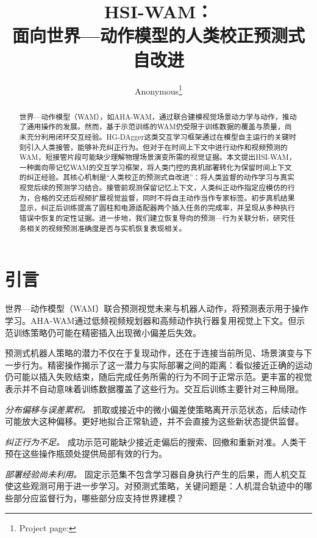 \documentclass[letterpaper,10pt,conference]{ieeeconf}
\title{HSI-WAM：\\面向世界—动作模型的人类校正预测式自改进}
\author{Anonymous\thanks{Project page: \projecturl}}
\begin{document}
\maketitle
\thispagestyle{empty}
\pagestyle{empty}

\begin{abstract}
世界—动作模型（WAM），如AHA-WAM，通过联合建模视觉场景动力学与动作，推动了通用操作的发展。然而，基于示范训练的WAM仍受限于训练数据的覆盖与质量，尚未充分利用闭环交互经验。HG-DAgger这类交互学习框架通过在模型自主运行的关键时刻引入人类接管，能够补充纠正行为。但对于在时间上下文中进行动作和视频预测的WAM，短接管片段可能缺少理解物理场景演变所需的视觉证据。本文提出HSI-WAM，一种面向带记忆WAM的交互学习框架，将人类门控的真机部署转化为保留时间上下文的纠正经验。其核心机制是“人类校正的预测式自改进”：将人类监督的动作学习与真实视觉后续的预测学习结合。接管前观测保留记忆上下文，人类纠正动作指定应模仿的行为，合格的交还后视频扩展视觉监督，同时不将自主动作当作专家标签。初步真机结果显示，纠正后训练提高了圆柱和电源适配器两个插入任务的完成率，并呈现从多种执行错误中恢复的定性证据。进一步地，我们建立恢复导向的预测—行为关联分析，研究任务相关的视频预测准确度是否与实机恢复表现相关。
\end{abstract}
\section{引言}
世界—动作模型（WAM）联合预测视觉未来与机器人动作，将预测表示用于操作学习\cite{videovla,ahawam}。AHA-WAM通过低频视频规划器和高频动作执行器复用视觉上下文\cite{ahawam}。但示范训练策略仍可能在精密插入出现微小偏差后失效。

预测式机器人策略的潜力不仅在于复现动作，还在于连接当前所见、场景演变与下一步行为。精密操作揭示了这一潜力与实际部署之间的距离：看似接近正确的运动仍可能以插入失败结束，随后完成任务所需的行为不同于正常示范。更丰富的视觉表示并不自动意味着训练数据覆盖了这些行为。交互后训练主要针对三种局限。

\textit{分布偏移与误差累积。} 抓取或接近中的微小偏差使策略离开示范状态，后续动作可能放大这种偏移\cite{dagger}。更好地拟合正常轨迹，并不会直接为这些新状态提供监督。

\textit{纠正行为不足。} 成功示范可能缺少接近走偏后的搜索、回撤和重新对准。人类干预在这些操作瓶颈处提供局部有效的行为\cite{iwr}。

\textit{部署经验尚未利用。} 固定示范集不包含学习器自身执行产生的后果，而人机交互使这些观测可用于进一步学习\cite{sirius}。对预测式策略，关键问题是：人机混合轨迹中的哪些部分应监督行为，哪些部分应支持世界建模？
\end{document}
